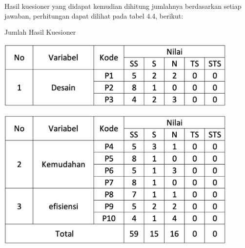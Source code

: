 \begin{flushleft}
\begin{justify}
            \vspace{10cm}
       \newline \noindent Hasil kuesioner yang didapat kemudian dihitung jumlahnya berdasarkan setiap jawaban, perhitungan dapat dilihat pada tabel 4.4, berikut:\\
        \begin{table}[ht]
            \centering
            \caption{Jumlah Hasil Kuesioner}
            \includegraphics[width=12cm]{images/bab 4/hitungan1.png}\\
            \end{table}
        \begin{table}[ht]
            \centering
            \includegraphics[width=12cm]{images/bab 4/hitungan2.png}\\
            \end{table}
            \vspace{8cm}
            

\end{justify}
\end{flushleft}
